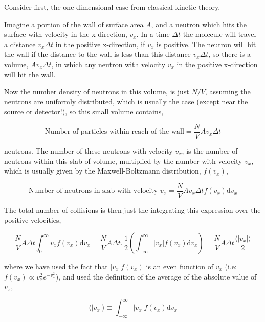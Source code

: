 \documentclass[11pt,a4paper,oneside]{article}
\begin{document}
Consider first, the one-dimensional case from classical kinetic theory. 

Imagine a portion of the wall of surface area $A$, and a neutron which hits the surface with velocity in the x-direction, $v_{x}$. In a time $\Delta t$ the molecule will travel a distance $v_{x} \Delta t$ in the positive x-direction, if $v_{x}$ is positive. The neutron will hit the wall if the distance to the wall is less than this distance $v_{x} \Delta t$, so there is a volume, $A v_{x} \Delta t$, in which any neutron with velocity $v_{x}$ in the positive x-direction will hit the wall. 

Now the number density of neutrons in this volume, is just $N/V$, assuming the neutrons are uniformly distributed, which is usually the case (except near the source or detector!), so this small volume contains, 

\begin{equation}
	\mbox{Number of particles within reach of the wall} = \frac{N}{V}Av_{x}\Delta t
\end{equation} 

neutrons. The number of these neutrons with velocity $v_{x}$, is the number of neutrons within this slab of volume, multiplied by the number with velocity $v_{x}$, which is usually given by the Maxwell-Boltzmann distribution, $f(v_{x})$,

\begin{equation}
\mbox{Number of neutrons in slab with velocity } v_{x} = \frac{N}{V}Av_{x}\Delta t f(v_{x})\mathrm{d}v_{x}
\end{equation}

The total number of collisions is then just the integrating this expression over the positive velocities, 

\begin{equation}
\frac{N}{V}A\Delta t \int_{0}^{\infty} v_{x}f(v_{x})\mathrm{d}v_{x} = \frac{N}{V}A\Delta t . \, \frac{1}{2}\left( \int_{-\infty}^{\infty} |v_{x}|f(v_{x})\mathrm{d}v_{x} \right) = \frac{N}{V}A\Delta t \frac{\langle |v_{x}| \rangle}{2}
\end{equation}

where we have used the fact that $|v_{x}|f(v_{x})$ is an even function of $v_{x}$ (i.e: $f(v_{x}) \propto v_{x}^{2}e^{-v^{2}_{x}}$), and used the definition of the average of the absolute value of $v_{x}$,

\begin{equation}
\langle |v_{x}| \rangle \equiv \int_{-\infty}^{\infty} |v_{x}|f(v_{x})\mathrm{d}v_{x}
\end{equation}
\end{document}
